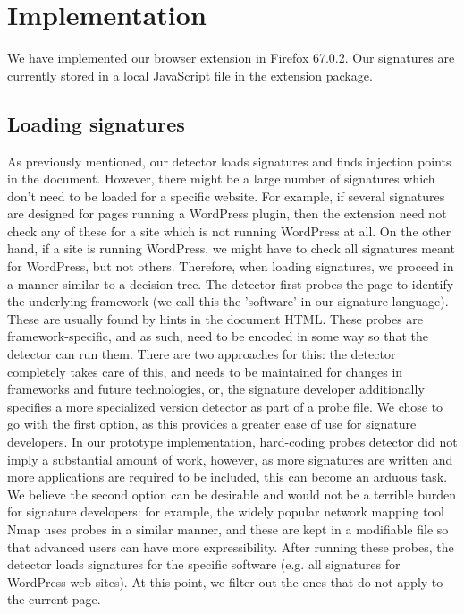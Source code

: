 \section{Implementation}

We have implemented our browser extension in Firefox 67.0.2. Our signatures are currently stored in a local JavaScript file in the extension package.

\subsection{Loading signatures}
As previously mentioned, our detector loads signatures and finds injection points in the document. However, there might be a large number of signatures which don't need to be loaded for a specific website. For example, if several signatures are designed for pages running a WordPress plugin, then the extension need not check any of these for a site which is not running WordPress at all. On the other hand, if a site is running WordPress, we might have to check all signatures meant for WordPress, but not others. Therefore, when loading signatures, we proceed in a manner similar to a decision tree. The detector first probes the page to identify the underlying framework (we call this the 'software' in our signature language). These are usually found by hints in the document HTML. These probes are framework-specific, and as such, need to be encoded in some way so that the detector can run them. There are two approaches for this: the detector completely takes care of this, and needs to be maintained for changes in frameworks and future technologies, or, the signature developer additionally specifies a more specialized version detector as part of a probe file. We chose to go with the first option, as this provides a greater ease of use for signature developers. In our prototype implementation, hard-coding probes detector did not imply a substantial amount of work, however, as more signatures are written and more applications are required to be included, this can become an arduous task. We believe the second option can be desirable and would not be a terrible burden for signature developers: for example, the widely popular network mapping tool Nmap \cite{nMap} uses probes in a similar manner, and these are kept in a modifiable file so that advanced users can have more expressibility. After running these probes, the detector loads signatures for the specific software (e.g. all signatures for WordPress web sites). At this point, we filter out the ones that do not apply to the current page.

